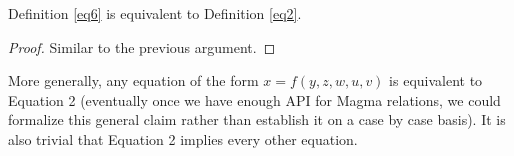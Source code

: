 \begin{theorem}[6 equivalent to 2]\label{6_equiv_2}\leanok  Definition \ref{eq6} is equivalent to Definition \ref{eq2}.
\end{theorem}

\begin{proof}\leanok  Similar to the previous argument.
\end{proof}

More generally, any equation of the form $x = f(y,z,w,u,v)$ is equivalent to Equation 2 (eventually once we have enough API for Magma relations, we could formalize this general claim rather than establish it on a case by case basis).  It is also trivial that Equation 2 implies every other equation.
